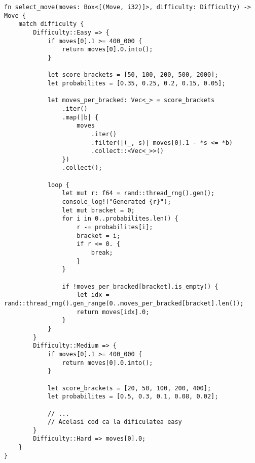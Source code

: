 \begin{lstlisting}[language=RustHtml]
fn select_move(moves: Box<[(Move, i32)]>, difficulty: Difficulty) -> Move {
    match difficulty {
        Difficulty::Easy => {
            if moves[0].1 >= 400_000 {
                return moves[0].0.into();
            }

            let score_brackets = [50, 100, 200, 500, 2000];
            let probabilites = [0.35, 0.25, 0.2, 0.15, 0.05];

            let moves_per_bracked: Vec<_> = score_brackets
                .iter()
                .map(|b| {
                    moves
                        .iter()
                        .filter(|(_, s)| moves[0].1 - *s <= *b)
                        .collect::<Vec<_>>()
                })
                .collect();

            loop {
                let mut r: f64 = rand::thread_rng().gen();
                console_log!("Generated {r}");
                let mut bracket = 0;
                for i in 0..probabilites.len() {
                    r -= probabilites[i];
                    bracket = i;
                    if r <= 0. {
                        break;
                    }
                }

                if !moves_per_bracked[bracket].is_empty() {
                    let idx = rand::thread_rng().gen_range(0..moves_per_bracked[bracket].len());
                    return moves[idx].0;
                }
            }
        }
        Difficulty::Medium => {
            if moves[0].1 >= 400_000 {
                return moves[0].0.into();
            }

            let score_brackets = [20, 50, 100, 200, 400];
            let probabilites = [0.5, 0.3, 0.1, 0.08, 0.02];

            // ...
            // Acelasi cod ca la dificulatea easy
        }
        Difficulty::Hard => moves[0].0;
    }
}
\end{lstlisting}

